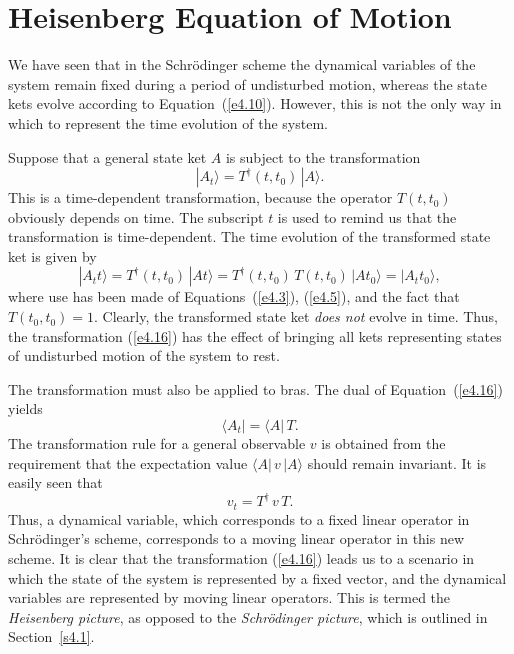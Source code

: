 \section{Heisenberg  Equation of Motion}\label{s4.2}
We have seen that in the Schr\"{o}dinger scheme the dynamical variables of the
system remain fixed during a period of undisturbed motion, whereas the state kets
evolve according to Equation~(\ref{e4.10}). However, this is not the only way in which
to represent the time evolution of the system. 

Suppose that a general state ket $A$ is subject to the transformation 
\begin{equation}\label{e4.16}
|A_t \rangle = T^{\dag}(t, t_0)\, |A\rangle.
\end{equation}
This is a time-dependent transformation,  because  the operator $T(t, t_0)$ obviously
depends on time. The subscript $t$ is used to remind us that the transformation
is time-dependent. 
 The time evolution of the transformed state ket is given by
\begin{equation}
|A_t t\rangle = T^{\dag} (t, t_0)\,|At\rangle = T^{\dag} (t, t_0)\,T (t, t_0)\,
|At_0\rangle = |A_t t_0\rangle,
\end{equation}
where use has been made of Equations~(\ref{e4.3}), (\ref{e4.5}), and the fact that $T(t_0, t_0)=1$. 
Clearly, the transformed state ket {\em does not}\/ evolve in time. Thus, the
transformation (\ref{e4.16}) has the effect of bringing all kets representing
states of undisturbed motion of the system to rest. 

The transformation  must also be applied to bras. The dual of Equation~(\ref{e4.16})
yields
\begin{equation}
\langle A_t| =\langle A| \,T.
\end{equation}
The transformation rule for a general observable $v$ is obtained from the requirement
that the expectation value $\langle A|\,v\,|A\rangle$ 
should remain invariant. It is easily
seen that
\begin{equation}\label{e4.19}
v_t = T^{\dag} \,v \,T.
\end{equation}
Thus, a dynamical variable, which corresponds to a fixed linear operator in
Schr\"{o}\-dinger's scheme, corresponds to a moving linear operator in this
new scheme. It is clear that the transformation (\ref{e4.16}) leads us to a scenario
in which the state  of the system is represented by
a
 fixed vector, and the dynamical variables
are represented by moving linear operators. This is termed the {\em Heisenberg
picture}, as opposed to the {\em Schr\"{o}dinger picture},
which is  outlined in Section~\ref{s4.1}.

